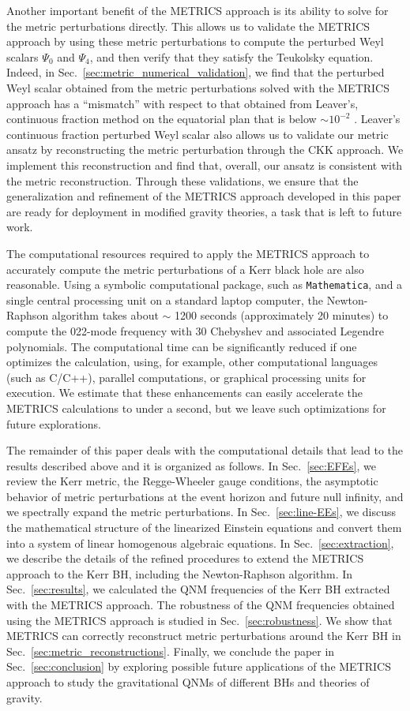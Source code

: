 \documentclass[aps,prx,amsmath,floats,floatfix,twocolumn,
  superscriptaddress,nofootinbib,showpacs]{revtex4-1}
\begin{document}
Another important benefit of the METRICS approach is its ability to solve for the metric perturbations directly. 
This allows us to validate the METRICS approach by using these metric perturbations to compute the perturbed Weyl scalars $\Psi_{0}$ and $\Psi_{4}$, and then verify that they satisfy the Teukolsky equation. 
Indeed, in Sec.~\ref{sec:metric_numerical_validation}, we find that the perturbed Weyl scalar obtained from the metric perturbations solved with the METRICS approach has a ``mismatch'' with respect to that obtained from Leaver's, continuous fraction method on the equatorial plan that is below $\sim 10^{-2}$ .
Leaver's continuous fraction perturbed Weyl scalar also allows us to validate our metric ansatz by reconstructing the metric perturbation through the CKK approach. 
We implement this reconstruction and find that, overall, our ansatz is consistent with the metric reconstruction. 
Through these validations, we ensure that the generalization and refinement of the METRICS approach developed in this paper are ready for deployment in modified gravity theories, a task that is left to future work.  

The computational resources required to apply the METRICS approach to accurately compute the metric perturbations of a Kerr black hole are also reasonable. 
Using a symbolic computational package, such as \texttt{Mathematica}, and a single central processing unit on a standard laptop computer, the Newton-Raphson algorithm takes about $\sim$ 1200 seconds (approximately 20 minutes) to compute the 022-mode frequency with 30 Chebyshev and associated Legendre polynomials. 
The computational time can be significantly reduced if one optimizes the calculation, using, for example, other computational languages (such as C/C++), parallel computations, or graphical processing units for execution. 
We estimate that these enhancements can easily accelerate the METRICS calculations to under a second, but we leave such optimizations for future explorations. 

The remainder of this paper deals with the computational details that lead to the results described above and it is organized as follows.  
In Sec.~\ref{sec:EFEs}, we review the Kerr metric, the Regge-Wheeler gauge conditions, the asymptotic behavior of metric perturbations at the event horizon and future null infinity, and we spectrally expand the metric perturbations. 
In Sec.~\ref{sec:line-EEs}, we discuss the mathematical structure of the linearized Einstein equations and convert them into a system of linear homogenous algebraic equations. 
In Sec.~\ref{sec:extraction}, we describe the details of the refined procedures to extend the METRICS approach to the Kerr BH, including the Newton-Raphson algorithm. 
In Sec.~\ref{sec:results}, we calculated the QNM frequencies of the Kerr BH extracted with the METRICS approach.
The robustness of the QNM frequencies obtained using the METRICS approach is studied in Sec.~\ref{sec:robustness}. 
We show that METRICS can correctly reconstruct metric perturbations around the Kerr BH in Sec.~\ref{sec:metric_reconstructions}. 
Finally, we conclude the paper in Sec.~\ref{sec:conclusion} by exploring possible future applications of the METRICS approach to study the gravitational QNMs of different BHs and theories of gravity.  
\end{document}
